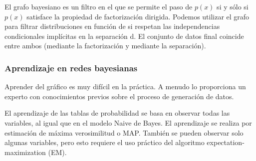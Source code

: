 El grafo bayesiano es un filtro en el que se permite el paso de $p(x)$ si y sólo si $p(x)$ satisface la propiedad de factorización dirigida. Podemos utilizar el grafo para filtrar distribuciones en función de si respetan las independencias condicionales implícitas en la separación d. El conjunto de datos final coincide entre ambos (mediante la factorización y mediante la separación).

\subsubsection{Aprendizaje en redes bayesianas}
Aprender del gráfico es muy difícil en la práctica. A menudo lo proporciona un experto con conocimientos previos sobre el proceso de generación de datos.

El aprendizaje de las tablas de probabilidad se basa en observar todas las variables, al igual que en el modelo Naive de Bayes. El aprendizaje se realiza por estimación de máxima verosimilitud o MAP. También se pueden observar solo algunas variables, pero esto requiere el uso práctico del algoritmo expectation-maximization (EM).

